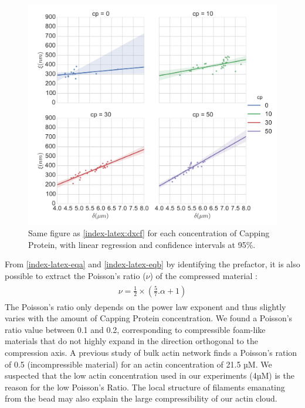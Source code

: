 \documentclass[A4paperpaper,11pt,english]{sphinxmanual}
\begin{document}
\begin{figure}[htbp]
\centering
\capstart

\includegraphics[width=1.000\linewidth]{delta-xi-facets.pdf}
\caption{Same figure as \hyperref[index-latex:dxcf]{ \ref*{index-latex:dxcf}} for each concentration of Capping Protein,
with linear regression and confidence intervals at 95\%.}\label{index-latex:dxf}\end{figure}

From \eqref{index-latex-eqa} and \eqref{index-latex-eqb} by identifying the prefactor, it is also possible
to extract the Poisson’s ratio (\(\nu\)) of the compressed material :
\label{index-latex:equation-nu=f(alpha)}\begin{gather}
\begin{split}\nu =\frac 1 2 \times \left( \frac 5 7.\alpha +1\right)\end{split}\label{index-latex-nu=f(alpha)}
\end{gather}
The Poisson’s ratio only depends on the power law exponent and thus slightly varies
with the amount of Capping Protein concentration.  We found a Poisson’s ratio value between 0.1 and 0.2, corresponding to compressible
foam-like materials that do not highly expand in the direction orthogonal to
the compression axis. A previous study of bulk actin network finds a Poisson’s
ration of 0.5 (incompressible material) for an actin concentration of 21.5 µM.  We
suspected that the low actin concentration used in our experiments (4µM) is the
reason for the low Poisson’s Ratio. The local structure of filaments
emanating from the  bead may also explain the large compressibility of our actin
cloud.
\end{document}
